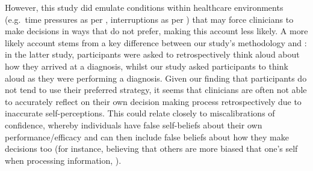 \documentclass[a4paper, nobind]{templates/ociamthesis}
\begin{document}
However, this study did emulate conditions within healthcare environments (e.g.~time pressures as per \textcite{gupta_associations_2023}, interruptions as per \textcite{soares_accuracy_2019}) that may force clinicians to make decisions in ways that do not prefer, making this account less likely. A more likely account stems from a key difference between our study's methodology and \textcite{coderre_diagnostic_2003} : in the latter study, participants were asked to retrospectively think aloud about how they arrived at a diagnosis, whilst our study asked participants to think aloud as they were performing a diagnosis. Given our finding that participants do not tend to use their preferred strategy, it seems that clinicians are often not able to accurately reflect on their own decision making process retrospectively due to inaccurate self-perceptions. This could relate closely to miscalibrations of confidence, whereby individuals have false self-beliefs \autocite{oeberst_toward_2023} about their own performance/efficacy \autocite{alicke_better-than-average_2005} and can then include false beliefs about how they make decisions too (for instance, believing that others are more biased that one's self when processing information, \textcite{pronin_bias_2002}).
\end{document}

